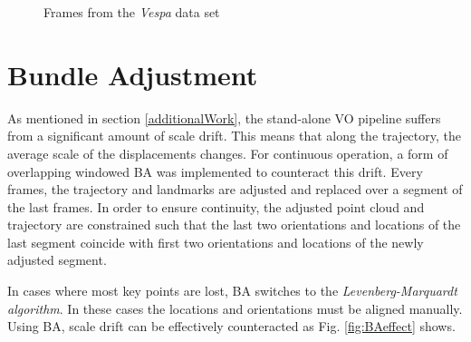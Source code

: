 \begin{figure}[htp]
\hfill
{}\hfill
{}
\caption{Frames from the \emph{Vespa} data set}
\end{figure}

\section{Bundle Adjustment}
\label{bundle adjustment}
As mentioned in section \ref{additionalWork}, the stand-alone VO pipeline suffers from a significant amount of scale drift. 
This means that along the trajectory, the average scale of the displacements changes. 
For continuous operation, a form of overlapping windowed BA was implemented to counteract this drift.  
Every \baEveryNthFrame frames, the trajectory and landmarks are adjusted and replaced over a segment of the last \baReplaceframes frames. 
In order to ensure continuity, the adjusted point cloud and trajectory are constrained such that the last two orientations and locations of the last segment coincide with first two orientations and locations of the newly adjusted segment. \par
In cases where most key points are lost, BA switches to the \emph{Levenberg-Marquardt algorithm}. In these cases the locations and orientations must be aligned manually.  
Using BA, scale drift can be effectively counteracted as Fig. \ref{fig:BAeffect} shows.

